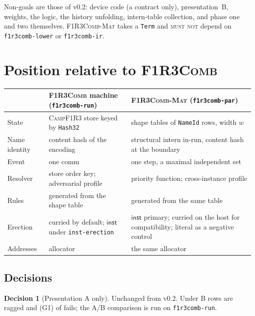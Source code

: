 \documentclass[11pt,a4paper]{article}
\newcommand{\code}[1]{\texttt{#1}}
\newcommand{\Comb}{\textsc{F1R3Comb}}
\newcommand{\Mat}{\textsc{F1R3Comb-Mat}}
\newcommand{\Camp}{\textsc{CampF1R3}}
\newcommand{\MUSTNOT}{\textsc{must not}}
\theoremstyle{definition}
\newtheorem{decision}[definition]{Decision}
\theoremstyle{plain}
\newcommand{\inst}{\mathsf{inst}}
\begin{document}
\noindent
Non-goals are those of v0.2: device code (a contract only), presentation~B,
weights, the logic, the history unfolding, intern-table collection, and phase
one and two themselves. \Mat{} takes a \code{Term} and \MUSTNOT{} depend on
\code{f1r3comb-lower} or \code{f1r3comb-ir}.

\section{Position relative to \Comb}\label{sec:position}

\begin{center}
\begin{tabularx}{\linewidth}{@{}l>{\raggedright\arraybackslash}X>{\raggedright\arraybackslash}X@{}}
\toprule
& \Comb{} machine (\code{f1r3comb-run}) & \Mat{} (\code{f1r3comb-par})\\
\midrule
State & \Camp{} store keyed by \code{Hash32} & shape tables of \code{NameId}
rows, width $w$\\
Name identity & content hash of the encoding & structural intern in-run,
content hash at the boundary\\
Event & one comm & one step, a maximal independent set\\
Resolver & store order key; adversarial profile \cite[Obl.~11.2]{combspec}
& priority function; cross-instance profile\\
Rules & generated from the shape table & generated from the same table\\
Erection & curried by default; $\inst$ under \code{inst-erection} &
$\inst$ primary; curried on the host for compatibility; literal as a negative
control\\
Addresses & allocator \cite[Req.~9.5]{combspec} & the same allocator\\
\bottomrule
\end{tabularx}
\end{center}

\subsection{Decisions}

\begin{decision}[Presentation A only]\label{dec:aonly}
Unchanged from v0.2. Under B rows are ragged and (G1) of
\cite[\S2.1]{matnote} fails; the A/B comparison \cite[Obl.~11.10]{combspec}
is run on \code{f1r3comb-run}.
\end{decision}
\end{document}
